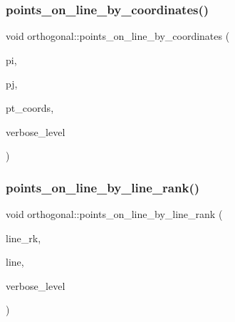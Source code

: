 \mbox{\label{classorthogonal_a50fb1aa349d159551e82075f1f5f788d}} 
\subsubsection{\texorpdfstring{points\+\_\+on\+\_\+line\+\_\+by\+\_\+coordinates()}{points\_on\_line\_by\_coordinates()}}
{\footnotesize\ttfamily void orthogonal\+::points\+\_\+on\+\_\+line\+\_\+by\+\_\+coordinates (\begin{DoxyParamCaption}\item[{\mbox{\hyperlink{galois_8h_a09fddde158a3a20bd2dcadb609de11dc}{I\+NT}}}]{pi,  }\item[{\mbox{\hyperlink{galois_8h_a09fddde158a3a20bd2dcadb609de11dc}{I\+NT}}}]{pj,  }\item[{\mbox{\hyperlink{galois_8h_a09fddde158a3a20bd2dcadb609de11dc}{I\+NT}} $\ast$}]{pt\+\_\+coords,  }\item[{\mbox{\hyperlink{galois_8h_a09fddde158a3a20bd2dcadb609de11dc}{I\+NT}}}]{verbose\+\_\+level }\end{DoxyParamCaption})}

\mbox{\label{classorthogonal_aec3f511b69d0a28340f93d6f904c5daa}} 
\subsubsection{\texorpdfstring{points\+\_\+on\+\_\+line\+\_\+by\+\_\+line\+\_\+rank()}{points\_on\_line\_by\_line\_rank()}}
{\footnotesize\ttfamily void orthogonal\+::points\+\_\+on\+\_\+line\+\_\+by\+\_\+line\+\_\+rank (\begin{DoxyParamCaption}\item[{\mbox{\hyperlink{galois_8h_a09fddde158a3a20bd2dcadb609de11dc}{I\+NT}}}]{line\+\_\+rk,  }\item[{\mbox{\hyperlink{galois_8h_a09fddde158a3a20bd2dcadb609de11dc}{I\+NT}} $\ast$}]{line,  }\item[{\mbox{\hyperlink{galois_8h_a09fddde158a3a20bd2dcadb609de11dc}{I\+NT}}}]{verbose\+\_\+level }\end{DoxyParamCaption})}

